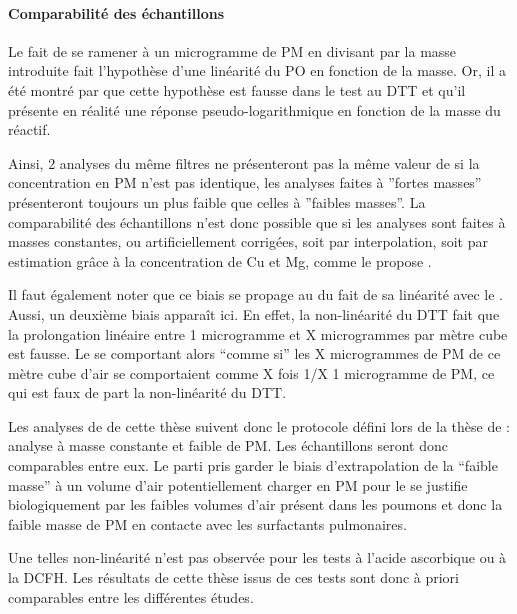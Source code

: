 \paragraph{Comparabilité des échantillons}%
\label{par:comparabilité_des_échantillons}

Le fait de se ramener à un microgramme de PM en divisant par la masse introduite fait
l'hypothèse d'une linéarité du PO en fonction de la masse. Or, il a été montré par
\textcite{charrierDithiothreitol2012,charrierBias2016,calasComparison2018} que cette
hypothèse est fausse dans le test au DTT et qu'il présente en réalité une réponse
pseudo-logarithmique en fonction de la masse du réactif.

Ainsi, 2 analyses du même filtres ne présenteront pas la même valeur de \PODTTm{} si la
concentration en PM n'est pas identique, les analyses faites à ''fortes masses''
présenteront toujours un \PODTTm{} plus faible que celles à ''faibles masses''.
La comparabilité des échantillons n'est donc possible que si les analyses sont faites à
masses constantes, ou artificiellement corrigées, soit par interpolation, soit par
estimation grâce à la concentration de Cu et Mg, comme le propose
\textcite{charrierBias2016}.

Il faut également noter que ce biais se propage au \PODTTv{} du fait de sa linéarité avec le
\PODTTm. Aussi, un deuxième biais apparaît ici. En effet, la non-linéarité du DTT fait
que la prolongation linéaire entre 1 microgramme et X microgrammes par mètre cube est
fausse. Le \PODTTv{} se comportant alors ``comme si'' les X microgrammes de PM de ce mètre
cube d'air se comportaient comme X fois 1/X 1 microgramme de PM, ce qui est faux de part
la non-linéarité du DTT.

Les analyses de \PODTT{} de cette thèse suivent donc le protocole défini lors de la thèse
de \textcite{calasPollution2017} : analyse à masse constante et faible de PM. Les
échantillons seront donc comparables entre eux. Le parti pris garder le biais
d'extrapolation de la ``faible masse'' à un volume d'air potentiellement charger en PM
pour le \PODTTv{} se justifie biologiquement par les faibles volumes d'air présent dans les
poumons et donc la faible masse de PM en contacte avec les surfactants pulmonaires.

Une telles non-linéarité n'est pas observée pour les tests à l'acide ascorbique ou à la
DCFH.
Les résultats de cette thèse issus de ces tests sont donc à priori comparables entre les
différentes études.


